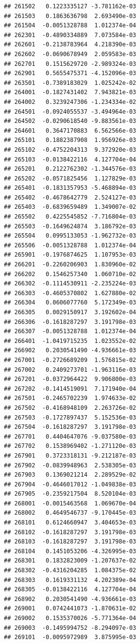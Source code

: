 \begin{frame}[fragile]
\begin{verbatim}
## 261502   0.1223335127 -3.781162e-03
## 261503   0.1863636798  2.693490e-03
## 261504  -0.0051328788  1.012374e-04
## 262301  -0.4890334889  7.073584e-03
## 262601  -0.2138783964  4.218390e-03
## 262602  -0.0690678949  2.059583e-03
## 262701   0.1515629720 -2.989324e-03
## 262901   0.5655475371 -4.152096e-03
## 263501  -0.7389183029  1.025242e-02
## 264001  -0.1827431402  7.943821e-03
## 264002   0.3239247306 -1.234334e-02
## 264501  -0.0924055537 -3.494964e-03
## 264502  -0.0290618540 -9.883561e-03
## 264601   0.3647170883  6.562566e-03
## 265101   0.1882387908  1.956926e-03
## 265102  -0.4752204313  9.372920e-03
## 265103  -0.0138422116  4.127704e-04
## 265201   0.2122762302 -1.344576e-03
## 265202  -0.0571825456  1.127829e-03
## 265401  -0.1831357953 -5.468894e-03
## 265402  -0.4678642779  2.524127e-03
## 265403  -0.6839659489  1.349007e-02
## 265502   0.4225545852 -7.716804e-03
## 265503  -0.1649624874  3.186792e-03
## 265504   0.0995133053 -1.962732e-03
## 265506  -0.0051328788  1.012374e-04
## 265901  -0.1976874625  1.107953e-03
## 266201  -0.2260206903  1.830960e-02
## 266202   0.1546257340  1.060710e-02
## 266302  -0.1114530911 -2.235224e-03
## 266303  -0.4605370802  1.627880e-02
## 266304   0.0606077760  5.172349e-03
## 266305   0.0029150917  3.192602e-04
## 266306  -0.1618287297  3.191798e-03
## 266307  -0.0051328788  1.012374e-04
## 266401  -1.0419715235  1.023552e-02
## 266902   0.2030541490 -4.936661e-03
## 267001  -0.2726689209  1.576815e-02
## 267002   0.2409273701 -1.963116e-03
## 267201  -0.0372964422  9.906800e-03
## 267202  -0.1414519091  7.171940e-04
## 267501  -0.2465702239  1.974633e-02
## 267502  -0.4168948109  2.263726e-02
## 267503  -0.1727897437  5.152536e-03
## 267504  -0.1618287297  3.191798e-03
## 267701   0.4404647076 -9.037580e-03
## 267702   0.1538969402 -1.271120e-03
## 267901   0.3723318131 -9.212187e-03
## 267902  -0.0839948963  2.538305e-03
## 267903   0.1369021214  2.289529e-02
## 267904  -0.4646017012 -1.049838e-03
## 267905  -0.2359217504  8.520104e-03
## 268001  -0.0015463568  1.069670e-04
## 268002   0.4649546737 -9.170445e-03
## 268101   0.6124660947  3.404653e-03
## 268102  -0.1618287297  3.191798e-03
## 268103  -0.1618287297  3.191798e-03
## 268104   0.1451053206 -4.326995e-03
## 268301   0.1832823009 -1.207637e-02
## 268302  -0.4316204285  1.084375e-02
## 268303   0.1619331132  4.202389e-04
## 268305  -0.0138422116  4.127704e-04
## 268902   0.2030541490 -4.936661e-03
## 269001   0.0742441073 -1.870631e-02
## 269002   0.1535370026 -5.771364e-04
## 269003  -0.1495994752 -8.294097e-03
## 269101  -0.0095972989  3.875995e-03

\end{verbatim}
\end{frame}
